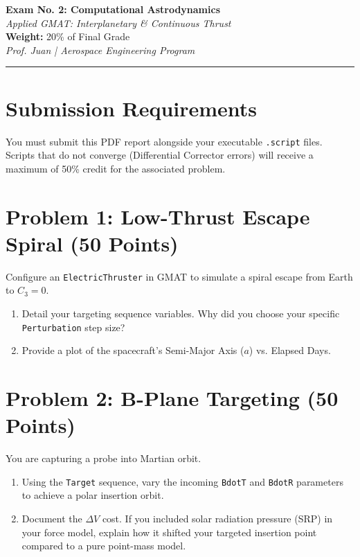 \documentclass[11pt, a4paper]{article}
\begin{document}
\begin{center}
    {\Large \textbf{Exam No. 2: Computational Astrodynamics}} \\
    \vspace{0.2cm}
    {\large \textit{Applied GMAT: Interplanetary \& Continuous Thrust}} \\
    \vspace{0.4cm}
    \textbf{Weight:} 20\% of Final Grade \\
    \textit{Prof. Juan | Aerospace Engineering Program}
\end{center}

\hrule
\vspace{0.5cm}

\section*{Submission Requirements}
You must submit this PDF report alongside your executable \texttt{.script} files. Scripts that do not converge (Differential Corrector errors) will receive a maximum of 50\% credit for the associated problem.

\section*{Problem 1: Low-Thrust Escape Spiral (50 Points)}
Configure an \texttt{ElectricThruster} in GMAT to simulate a spiral escape from Earth to $C_3 = 0$. 
\begin{enumerate}
    \item[(a)] Detail your targeting sequence variables. Why did you choose your specific \texttt{Perturbation} step size?
    \item[(b)] Provide a plot of the spacecraft's Semi-Major Axis ($a$) vs. Elapsed Days.
\end{enumerate}

\section*{Problem 2: B-Plane Targeting (50 Points)}
You are capturing a probe into Martian orbit.
\begin{enumerate}
    \item[(a)] Using the \texttt{Target} sequence, vary the incoming \texttt{BdotT} and \texttt{BdotR} parameters to achieve a polar insertion orbit.
    \item[(b)] Document the $\Delta V$ cost. If you included solar radiation pressure (SRP) in your force model, explain how it shifted your targeted insertion point compared to a pure point-mass model.
\end{enumerate}
\end{document}

